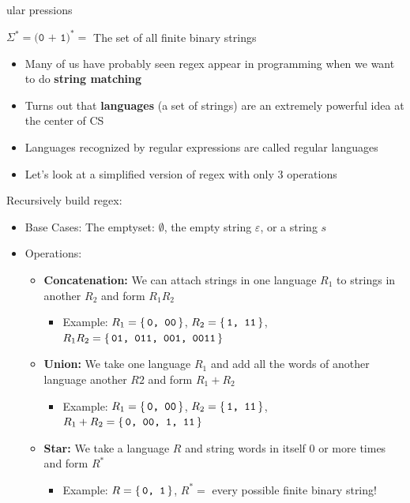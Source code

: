 \documentclass[aspectratio=169, handout]{beamer}
\begin{document}
\begin{frame}{ular pressions}

\begin{center}
    $ \Sigma^* = \texttt{(0 + 1)}^* = $ The set of all finite binary strings
\end{center}
    
    \begin{itemize}
        \item Many of us have probably seen regex appear in programming when we want to do \textbf{string matching} \pause
        \item Turns out that \textbf{languages} (a set of strings) are an extremely powerful idea at the center of CS \pause
        \item Languages recognized by regular expressions are called regular languages \pause
        \item Let's look at a simplified version of regex with only 3 operations
    \end{itemize}
    
\end{frame}

\begin{frame}{}
    Recursively build regex:
    \begin{itemize}
        \item Base Cases: The emptyset: $\emptyset$, the empty string $\varepsilon$, or a string $s$ \pause
        \item Operations:
        \begin{itemize}
            \item \textbf{Concatenation:} We can attach strings in one language $R_1$ to strings in another $R_2$ and form $R_1 R_2$
            \begin{itemize}
                \item Example: $R_1 = \set{\texttt{0, 00}}$, $R_2 = \set{\texttt{1, 11}}$, $R_1 R_2 = \set{\texttt{01, 011, 001, 0011}}$ \pause
            \end{itemize}
            \item \textbf{Union:} We take one language $R_1$ and add all the words of another language another $R2$ and form $R_1 + R_2$
            \begin{itemize}
                \item Example: $R_1 = \set{\texttt{0, 00}}$, $R_2 = \set{\texttt{1, 11}}$, $R_1 + R_2 = \set{\texttt{0, 00, 1, 11}}$ \pause
            \end{itemize}
            \item \textbf{Star:} We take a language $R$ and string words in itself 0 or more times and form $R^*$
            \begin{itemize}
                \item Example: $R = \set{\texttt{0, 1}}$, $R^* = $ every possible finite binary string!
            \end{itemize}
        \end{itemize}
    \end{itemize}
\end{frame}
\end{document}
